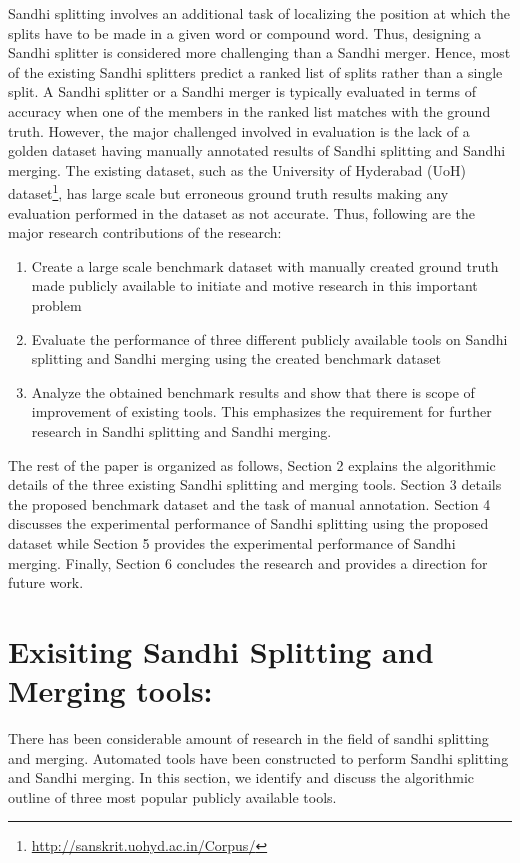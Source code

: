 \documentclass[11pt]{article}
\begin{document}
Sandhi splitting involves an additional task of localizing the position at which the splits have to be made in a given word or compound word. Thus, designing a Sandhi splitter is considered more challenging than a Sandhi merger. Hence, most of the existing Sandhi splitters predict a ranked list of splits rather than a single split. A Sandhi splitter or a Sandhi merger is typically evaluated in terms of accuracy when one of the members in the ranked list matches with the ground truth. However, the major challenged involved in evaluation is the lack of a golden dataset having manually annotated results of Sandhi splitting and Sandhi merging. The existing dataset, such as the University of Hyderabad (UoH) dataset\footnote{\url{http://sanskrit.uohyd.ac.in/Corpus/}}, has large scale but erroneous ground truth results making any evaluation performed in the dataset as not accurate. Thus, following are the major research contributions of the research:
\begin{enumerate}
	\item Create a large scale benchmark dataset with manually created ground truth made publicly available to initiate and motive research in this important problem
	\item Evaluate the performance of three different publicly available tools on Sandhi splitting and Sandhi merging using the created benchmark dataset
	\item Analyze the obtained benchmark results and show that there is scope of improvement of existing tools. This emphasizes the requirement for further research in Sandhi splitting and Sandhi merging.
\end{enumerate}

The rest of the paper is organized as follows, Section 2 explains the algorithmic details of the three existing Sandhi splitting and merging tools. Section 3 details the proposed benchmark dataset and the task of manual annotation. Section 4 discusses the experimental performance of Sandhi splitting using the proposed dataset while Section 5 provides the experimental performance of Sandhi merging. Finally, Section 6 concludes the research and provides a direction for future work. 


\section{Exisiting Sandhi Splitting and Merging tools:}
There has been considerable amount of research in the field of sandhi splitting and merging. Automated tools have been constructed to perform Sandhi splitting and Sandhi merging. In this section, we identify and discuss the algorithmic outline of three most popular publicly available tools.
\end{document}
